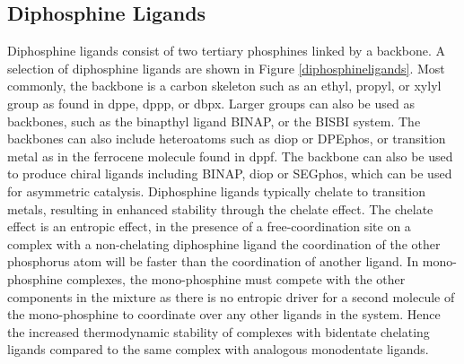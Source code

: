 
\subsection{Diphosphine Ligands}

Diphosphine ligands consist of two tertiary phosphines linked by a backbone.  A selection of diphosphine ligands are shown in Figure \ref{diphosphineligands}.  Most commonly, the backbone is a carbon skeleton such as an ethyl, propyl, or xylyl group as found in \acrshort{dppe}, \acrshort{dppp}, or \acrshort{dbpx}.  Larger groups can also be used as backbones, such as the binapthyl ligand \acrshort{BINAP}, or the \acrshort{BISBI} system.  The backbones can also include heteroatoms such as \acrshort{diop} or \acrshort{DPEphos}, or transition metal as in the ferrocene molecule found in \acrshort{dppf}.  The backbone can also be used to produce chiral ligands including \acrshort{BINAP}, \acrshort{diop} or \acrshort{SEGphos}, which can be used for asymmetric catalysis.\cite{Noyori2002, Agbossou1995, Shimizu2007}  Diphosphine ligands typically chelate to transition metals, resulting in enhanced stability through the chelate effect.  The chelate effect is an entropic effect, in the presence of a free-coordination site on a complex with a non-chelating diphosphine ligand the coordination of the other phosphorus atom will be faster than the coordination of another ligand.\cite{Housecroft2005}  In mono-phosphine complexes, the mono-phosphine must compete with the other components in the mixture as there is no entropic driver for a second molecule of the mono-phosphine to coordinate over any other ligands in the system.  Hence the increased thermodynamic stability of complexes with bidentate chelating ligands compared to the same complex with analogous monodentate ligands.  

